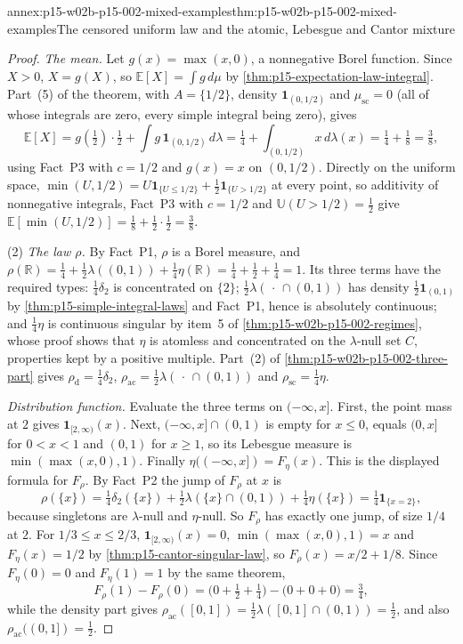 \begin{annexitem}{annex:p15-w02b-p15-002-mixed-examples}{thm:p15-w02b-p15-002-mixed-examples}{The censored uniform law and the atomic, Lebesgue and Cantor mixture}
\begin{proof}
\emph{The mean.} Let \(g(x)=\max(x,0)\), a nonnegative Borel function.
Since \(X>0\), \(X=g(X)\), so
\(\mathbb E[X]=\int g\,d\mu\) by \cref{thm:p15-expectation-law-integral}.
Part~(5) of the theorem, with \(A=\{1/2\}\), density
\(\mathbf1_{(0,1/2)}\) and \(\mu_{\mathrm{sc}}=0\) (all of whose
integrals are zero, every simple integral being zero), gives
\[
 \mathbb E[X]=g(\tfrac12)\cdot\tfrac12
   +\int g\,\mathbf1_{(0,1/2)}\,d\lambda
 =\tfrac14+\int_{(0,1/2)}x\,d\lambda(x)=\tfrac14+\tfrac18=\tfrac38,
\]
using Fact~P3 with \(c=1/2\) and \(g(x)=x\) on \((0,1/2)\). Directly on
the uniform space, \(\min(U,1/2)=U\mathbf1_{\{U\leq1/2\}}
+\tfrac12\mathbf1_{\{U>1/2\}}\) at every point, so additivity of
nonnegative integrals, Fact~P3 with \(c=1/2\) and
\(\mathbb U(U>1/2)=\tfrac12\) give
\(\mathbb E[\min(U,1/2)]=\tfrac18+\tfrac12\cdot\tfrac12=\tfrac38\).

(2) \emph{The law \(\rho\).} By Fact~P1, \(\rho\) is a Borel measure,
and \(\rho(\mathbb R)=\tfrac14+\tfrac12\lambda((0,1))+\tfrac14
\eta(\mathbb R)=\tfrac14+\tfrac12+\tfrac14=1\). Its three terms have the
required types: \(\tfrac14\delta_2\) is concentrated on \(\{2\}\);
\(\tfrac12\lambda(\,\cdot\,\cap(0,1))\) has density
\(\tfrac12\mathbf1_{(0,1)}\) by \cref{thm:p15-simple-integral-laws} and
Fact~P1, hence is absolutely continuous; and \(\tfrac14\eta\) is
continuous singular by item~5 of \cref{thm:p15-w02b-p15-002-regimes},
whose proof shows that \(\eta\) is atomless and concentrated on the
\(\lambda\)-null set \(C\), properties kept by a positive multiple.
Part~(2) of \cref{thm:p15-w02b-p15-002-three-part} gives
\(\rho_{\mathrm d}=\tfrac14\delta_2\),
\(\rho_{\mathrm{ac}}=\tfrac12\lambda(\,\cdot\,\cap(0,1))\) and
\(\rho_{\mathrm{sc}}=\tfrac14\eta\).

\emph{Distribution function.} Evaluate the three terms on
\((-\infty,x]\). First, the point mass at \(2\) gives
\(\mathbf1_{[2,\infty)}(x)\). Next,
\((-\infty,x]\cap(0,1)\) is empty for \(x\leq0\), equals \((0,x]\) for
\(0<x<1\) and \((0,1)\) for \(x\geq1\), so its Lebesgue measure is
\(\min(\max(x,0),1)\). Finally \(\eta((-\infty,x])=F_\eta(x)\). This is the
displayed formula for \(F_\rho\). By Fact~P2 the jump of \(F_\rho\) at
\(x\) is
\[
 \rho(\{x\})=\tfrac14\delta_2(\{x\})+\tfrac12\lambda(\{x\}\cap(0,1))
             +\tfrac14\eta(\{x\})=\tfrac14\mathbf1_{\{x=2\}},
\]
because singletons are \(\lambda\)-null and \(\eta\)-null. So \(F_\rho\)
has exactly one jump, of size \(1/4\) at \(2\). For
\(1/3\leq x\leq2/3\), \(\mathbf1_{[2,\infty)}(x)=0\),
\(\min(\max(x,0),1)=x\) and \(F_\eta(x)=1/2\) by
\cref{thm:p15-cantor-singular-law}, so \(F_\rho(x)=x/2+1/8\). Since
\(F_\eta(0)=0\) and \(F_\eta(1)=1\) by the same theorem,
\[
 F_\rho(1)-F_\rho(0)=\bigl(0+\tfrac12+\tfrac14\bigr)-\bigl(0+0+0\bigr)
                    =\tfrac34,
\]
while the density part gives
\(\rho_{\mathrm{ac}}([0,1])=\tfrac12\lambda([0,1]\cap(0,1))=\tfrac12\),
and also \(\rho_{\mathrm{ac}}((0,1])=\tfrac12\).


\end{proof}
\end{annexitem}
